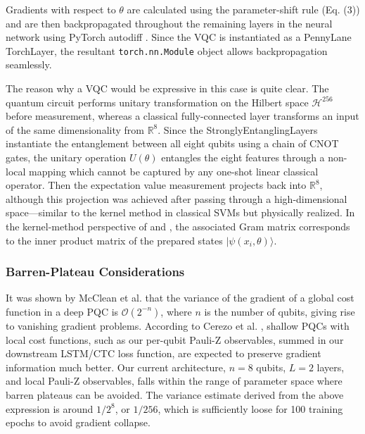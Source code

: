 \documentclass[preprint,12pt]{elsarticle}
\begin{document}
Gradients with respect to $\theta$ are calculated using the parameter-shift rule (Eq. (3)) and are then backpropagated throughout the remaining layers in the neural network using PyTorch autodiff \cite{b34}. Since the VQC is instantiated as a PennyLane TorchLayer, the resultant \texttt{torch.nn.Module} object allows backpropagation seamlessly.

The reason why a VQC would be expressive in this case is quite clear. The quantum circuit performs unitary transformation on the Hilbert space $\mathcal{H}^{256}$ before measurement, whereas a classical fully-connected layer transforms an input of the same dimensionality from $\mathbb{R}^8$. Since the StronglyEntanglingLayers instantiate the entanglement between all eight qubits using a chain of CNOT gates, the unitary operation $U(\theta)$ entangles the eight features through a non-local mapping which cannot be captured by any one-shot linear classical operator. Then the expectation value measurement projects back into $\mathbb{R}^8$, although this projection was achieved after passing through a high-dimensional space---similar to the kernel method in classical SVMs but physically realized. In the kernel-method perspective of \cite{b5} and \cite{b35}, the associated Gram matrix corresponds to the inner product matrix of the prepared states $|\psi(x_i, \theta)\rangle$.

\subsubsection{Barren-Plateau Considerations}
It was shown by McClean et al. \cite{b4} that the variance of the gradient of a global cost function in a deep PQC is $\mathcal{O}(2^{-n})$, where $n$ is the number of qubits, giving rise to vanishing gradient problems. According to Cerezo et al. \cite{b38}, shallow PQCs with local cost functions, such as our per-qubit Pauli-Z observables, summed in our downstream LSTM/CTC loss function, are expected to preserve gradient information much better. Our current architecture, $n = 8$ qubits, $L = 2$ layers, and local Pauli-Z observables, falls within the range of parameter space where barren plateaus can be avoided. The variance estimate derived from the above expression is around $1/2^8$, or $1/256$, which is sufficiently loose for 100 training epochs to avoid gradient collapse.
\end{document}
